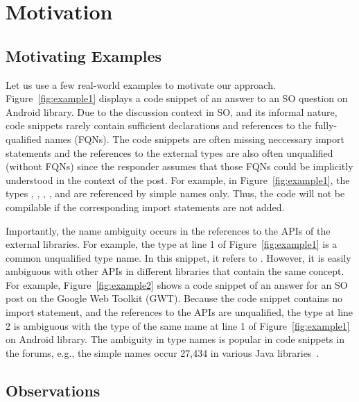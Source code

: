 \section{Motivation}
\label{motiv:sec}

\subsection{Motivating Examples}
\label{examples:sec}



Let us use a few real-world examples to motivate our approach.
Figure~\ref{fig:example1} displays a code snippet of an answer to an
SO question on Android library. Due to the discussion context in SO,
and its informal nature, code snippets rarely contain sufficient
declarations and references to the fully-qualified names (FQNs). The
code snippets are often missing neccessary import statements and the
references to the external types are also often unqualified (without
FQNs) since the responder assumes that those FQNs could be implicitly
understood in the context of the post. For example, in
Figure~\ref{fig:example1}, the types , ,
, , and  are referenced by simple
names only. Thus, the code will not be compilable if the corresponding
import statements are not added.



Importantly, the name ambiguity occurs in the references to the APIs
of the external libraries. For example, the type  at line
1 of Figure~\ref{fig:example1} is a common unqualified type name. In
this snippet, it refers to . However, it
is easily ambiguous with other APIs in different libraries that
contain the same concept. For example, Figure~\ref{fig:example2} shows
a code snippet of an answer for an SO post on the Google Web Toolkit
(GWT). Because the code snippet contains no import statement, and the
references to the APIs are unqualified, the type  at line
2 is ambiguous with the type of the same name at line 1 of
Figure~\ref{fig:example1} on Android library. The ambiguity in type
names is popular in code snippets in the forums, e.g., the
simple names  occur 27,434 in various Java
libraries~\cite{liveapi14}.

\subsection{Observations}
\label{sec:obs}

